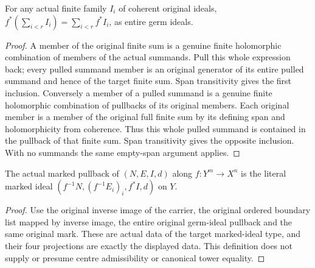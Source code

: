 \begin{lemma}\label{hir:crossdim-entire-finite-sum-pullback}
For any actual finite family $I_i$ of coherent original ideals,
$f^*(\sum_{i<r}I_i)=\sum_{i<r}f^*I_i$, as entire germ ideals.
\leanok
\end{lemma}
\begin{proof}
A member of the original finite sum is a genuine finite holomorphic
combination of members of the actual summands. Pull this whole expression
back; every pulled summand member is an original generator of its entire
pulled summand and hence of the target finite sum. Span transitivity gives
the first inclusion. Conversely a member of a pulled summand is a genuine
finite holomorphic combination of pullbacks of its original members. Each
original member is a member of the original full finite sum by its defining
span and holomorphicity from coherence. Thus this whole pulled summand is
contained in the pullback of that finite sum. Span transitivity gives the
opposite inclusion. With no summands the same empty-span argument applies.
\end{proof}

\begin{definition}\label{hir:crossdim-literal-marked-pullback}
The actual marked pullback of $(N,E,I,d)$ along $f:Y^m\to X^n$ is the
literal marked ideal $(f^{-1}N,(f^{-1}E_i)_i,f^*I,d)$ on $Y$.
\leanok
\end{definition}
\begin{proof}
Use the original inverse image of the carrier, the original ordered boundary
list mapped by inverse image, the entire original germ-ideal pullback and the
same original mark. These are actual data of the target marked-ideal type,
and their four projections are exactly the displayed data. This definition
does not supply or presume centre admissibility or canonical tower equality.
\end{proof}

